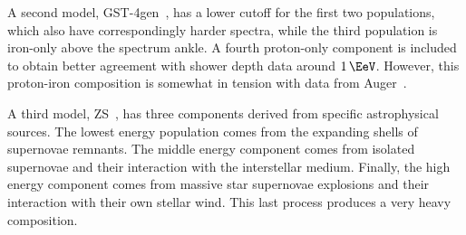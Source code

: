 A second model, GST-4gen~\cite{Gaisser:2013bla}, has a lower cutoff for the first two populations, which also have correspondingly harder spectra, while the third population is iron-only above the spectrum ankle.
A fourth proton-only component is included to obtain better agreement with shower depth data around $\SI{1}\EeV$.
However, this proton-iron composition is somewhat in tension with data from Auger~\cite{Abraham:2010yv, Aab:2014aea}.

A third model, ZS~\cite{Zatsepin:2006ci}, has three components derived from specific astrophysical sources.
The lowest energy population comes from the expanding shells of supernovae remnants.
The middle energy component comes from isolated supernovae and their interaction with the interstellar medium.
Finally, the high energy component comes from massive star supernovae explosions and their interaction with their own stellar wind.
This last process produces a very heavy composition.

